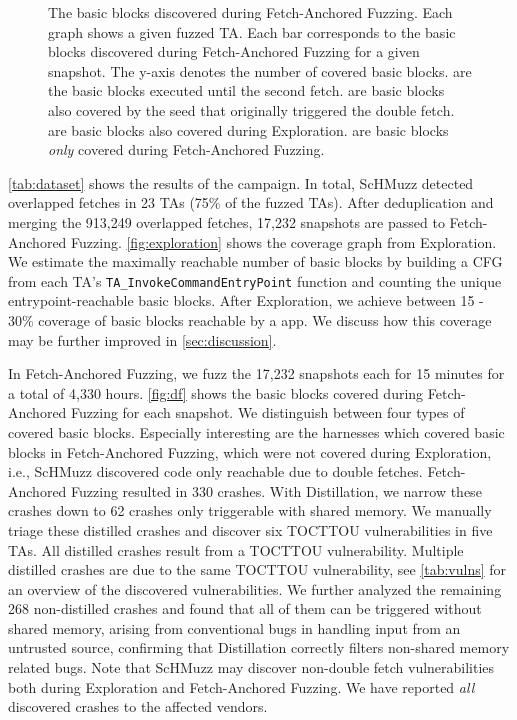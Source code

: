 \documentclass[conference]{IEEEtran}
\newcommand{\sysname}{ScHMuzz\xspace}
\newcommand{\stageone}{Exploration\xspace}
\newcommand{\stagetwo}{Fetch-Anchored Fuzzing\xspace}
\newcommand{\stagethree}{Distillation\xspace}
\newcommand{\numTAsdf}{23\xspace}
\newcommand{\numdfs}{913,249\xspace}
\newcommand{\numdfsmerge}{17,232\xspace}
\newcommand{\numcrashes}{330\xspace}
\newcommand{\numcrashesdistill}{62\xspace}
\newcommand{\numvulns}{six\xspace}
\newcommand{\numvulnTAs}{five\xspace}
\begin{document}
\begin{figure}
\begin{tikzpicture}
    \end{tikzpicture}
    \caption{
        The basic blocks discovered during \stagetwo. Each graph shows a given fuzzed TA. Each bar corresponds to the basic blocks discovered during \stagetwo for a given snapshot. The y-axis denotes the number of covered basic blocks.  
    \protect{} are the basic blocks executed until the second fetch. 
    \protect{} are basic blocks also covered by the seed that originally triggered the double fetch. 
    \protect{} are basic blocks also covered during \stageone. 
    \protect{} are basic blocks \emph{only} covered during \stagetwo. 
    }
    \label{fig:df}
\end{figure}

\autoref{tab:dataset} shows the results of the campaign. In total, \sysname detected 
overlapped fetches in \numTAsdf{} TAs (75\% of the fuzzed TAs). 
After deduplication and merging the \numdfs{} overlapped fetches, \numdfsmerge snapshots 
are passed to \stagetwo. \autoref{fig:exploration} shows the coverage graph from \stageone. 
We estimate the maximally reachable number of basic blocks by building a CFG from each TA's
\texttt{TA\_InvokeCommandEntryPoint} function and counting the unique entrypoint-reachable basic blocks. 
After \stageone, we achieve between 15 - 30\% coverage of basic blocks reachable by a app.
We discuss how this coverage may be further improved in \autoref{sec:discussion}.

In \stagetwo, we fuzz the \numdfsmerge snapshots each for 15 minutes for a total of 4,330 hours. 
\autoref{fig:df} shows the basic blocks covered during \stagetwo for each snapshot. 
We distinguish between four types of covered basic blocks. Especially interesting are the harnesses which covered basic blocks in \stagetwo, which 
were not covered during \stageone, i.e., \sysname discovered code only reachable due to double 
fetches. \stagetwo resulted in \numcrashes crashes. With \stagethree, we narrow these crashes 
down to \numcrashesdistill crashes only triggerable with shared memory. 
We manually triage these distilled 
crashes and discover \numvulns{} TOCTTOU vulnerabilities in \numvulnTAs TAs. 
All distilled crashes result from a TOCTTOU vulnerability. Multiple distilled 
crashes are due to the same TOCTTOU vulnerability, see \autoref{tab:vulns} 
for an overview of the discovered vulnerabilities.
We further analyzed the remaining 268 non-distilled crashes and found that all of them can 
be triggered without shared memory, arising from conventional bugs in handling input from 
an untrusted source, confirming that \stagethree correctly filters non-shared memory related bugs. 
Note that \sysname may discover non-double fetch vulnerabilities both during 
\stageone and \stagetwo. We have reported \emph{all} discovered crashes to 
the affected vendors.
\end{document}

